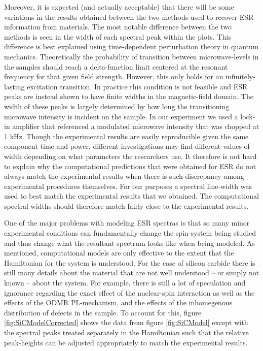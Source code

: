 \documentclass[oneside, noacknowlegments]{BYUPhys}
\begin{document}
Moreover, it is expected (and actually acceptable) that there will be some variations in the results obtained between the two methods used to recover ESR information from materials. The most notable difference between the two methods is seen in the width of each spectral peak within the plots. This difference is best explained using time-dependent perturbation theory in quantum mechanics. Theoretically the probability of transition between microwave-levels in the samples should reach a delta-function limit centered at the resonant frequency for that given field strength. However, this only holds for an infinitely-lasting excitation transition. In practice this condition is not feasible and ESR peaks are instead shown to have finite widths in the magnetic-field domain. The width of these peaks is largely determined by how long the transitioning microwave intensity is incident on the sample. In our experiment we used a lock-in amplifier that referenced a modulated microwave intensity that was chopped at 1 kHz. Though the experimental results are easily reproducible given the same component time and power, different investigations may find different values of width depending on what parameters the researchers use. It therefore is not hard to explain why the computational predictions that were obtained for ESR do not always match the experimental results when there is such discrepancy among experimental procedures themselves. For our purposes a spectral line-width was used to best match the experimental results that we obtained. The computational spectral widths should therefore match fairly close to the experimental results.

One of the major problems with modeling ESR spectras is that so many minor experimental conditions can fundamentally change the spin-system being studied and thus change what the resultant spectrum looks like when being modeled. As mentioned, computational models are only effective to the extent that the Hamiltonian for the system is understood. For the case of silicon carbide there is still many details about the material that are not well understood -- or simply not known -- about the system. For example, there is still a lot of speculation and ignorance regarding the exact effect of the nuclear-spin interaction as well as the effects of the ODMR PL-mechanism, and the effects of the inhomegenous distribution of defects in the sample. To account for this, figure \ref{fig:SiCModelCorrected} shows the data from figure \ref{fig:SiCModel} except with the spectral peaks treated separately in the Hamiltonian such that the relative peak-heights can be adjusted appropriately to match the experimental results.
\end{document}
